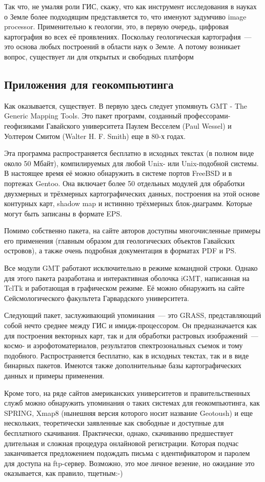Так что, не умаляя роли ГИС, скажу, что как инструмент исследования в науках о Земле более подходящим представляется то, что именуют задумчиво image processor. Применительно к геологии, это, в первую очередь, цифровая картография во всех её проявлениях. Поскольку геологическая картография~--- это основа любых построений в области наук о Земле. А потому возникает вопрос, существует ли для открытых и свободных платформ

\subsection{Приложения для геокомпьютинга}

Как оказывается, существует. В первую здесь следует упомянуть GMT - The Generic Mapping Tools. Это пакет программ, созданный профессорами-геофизиками Гавайского университета Паулем Весселем (Paul Wessel) и Уолтером Смитом (Walter H. F. Smith) еще в 80-х годах.

Эта программа распространяется бесплатно в исходных текстах (в полном виде около 50 Мбайт), компилируемых для любой Unix- или Unix-подобной системы. В настоящее время её можно обнаружить в системе портов FreeBSD и в портежах Gentoo. Она включает более 50 отдельных модулей для обработки двухмерных и трёхмерных картографических данных, построения на этой основе контурных карт, shadow map и истиннно трёхмерных блок-диаграмм. Которые могут быть записаны в формате EPS.

Помимо собственно пакета, на сайте авторов доступны многочисленные примеры его применения (главным образом для геологических объектов Гавайских островов), а также очень подробная документация в форматах PDF и PS.

Все модули GMT работают исключительно в режиме командной строки. Однако для этого пакета разработана и интерактивная оболочка iGMT, написанная на TclTk и работающая в графическом режиме. Её можно обнаружить на сайте Сейсмологического факультета Гарвардского университета.

Следующий пакет, заслуживающий упоминания~--- это GRASS, представляющий собой нечто среднее между ГИС и имидж-процессором. Он предназначается как для построения векторных карт, так и для обработки растровых изображений~--- космо- и аэрофотоматериалов, результатов спектрозональных съемок и тому подобного. Распространяется бесплатно, как в исходных текстах, так и в виде бинарных пакетов. Имеются также дополнительные базы картографических данных и примеры применения.

Кроме того, на ряде сайтов американских университетов и правительственных служб можно обнаружить упоминания о таких системах для геокомпьютинга, как SPRING, Xmap8 (нынешняя версия которого носит название Geotoush) и еще нескольких, теоретически заявленные как свободные и доступные для бесплатного скачивания. Практически, однако, скачиванию предшествует длительная и сложная процедура онлайновой регистрации. Которая подчас заканчивается предложением подождать письма с идентификатором и паролем для доступа на ftp-сервер. Возможно, это мое личное везение, но ожидание это оказывается, как правило, тщетным:-)

